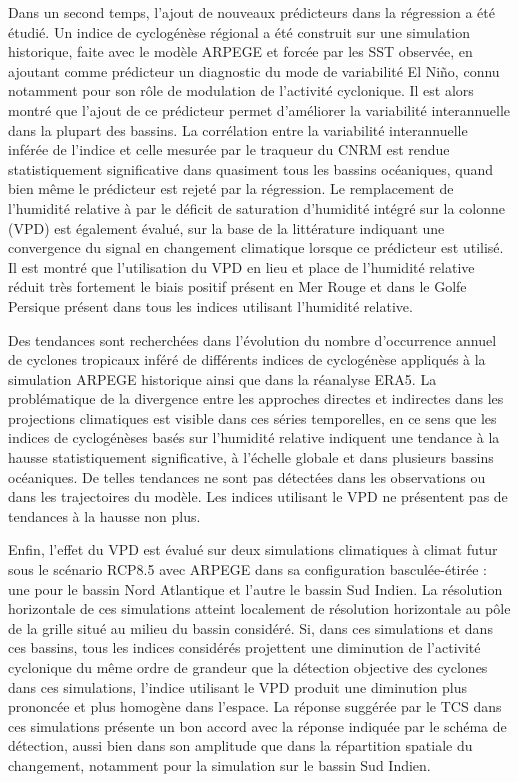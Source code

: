 \documentclass[../main.tex]{subfiles}
\begin{document}
Dans un second temps, l'ajout de nouveaux prédicteurs dans la régression a été étudié. Un indice de cyclogénèse régional a été construit sur une simulation
historique, faite avec le modèle ARPEGE et forcée par les SST observée, en ajoutant comme prédicteur un diagnostic du mode de variabilité El Niño, connu
notamment pour son rôle de modulation de l'activité cyclonique. Il est alors montré que l'ajout de ce prédicteur permet d'améliorer la variabilité interannuelle
dans la plupart des bassins. La corrélation entre la variabilité interannuelle inférée de l'indice et celle mesurée par le traqueur du CNRM est rendue
statistiquement significative dans quasiment tous les bassins océaniques, quand bien même le prédicteur est rejeté par la régression. Le remplacement de
l'humidité relative à  par le déficit de saturation d'humidité intégré sur la colonne (VPD) est également évalué, sur la base de la littérature
indiquant une convergence du signal en changement climatique lorsque ce prédicteur est utilisé. Il est montré que l'utilisation du VPD en lieu et place de
l'humidité relative réduit très fortement le biais positif présent en Mer Rouge et dans le Golfe Persique présent dans tous les indices utilisant l'humidité
relative.

Des tendances sont recherchées dans l'évolution du nombre d'occurrence annuel de cyclones tropicaux inféré de différents indices de cyclogénèse appliqués à la
simulation ARPEGE historique ainsi que dans la réanalyse ERA5. La problématique de la divergence entre les approches directes et indirectes dans les projections
climatiques est visible dans ces séries temporelles, en ce sens que les indices de cyclogénèses basés sur l'humidité relative indiquent une tendance à la hausse
statistiquement significative, à l'échelle globale et dans plusieurs bassins océaniques. De telles tendances ne sont pas détectées dans les observations ou
dans les trajectoires du modèle. Les indices utilisant le VPD ne présentent pas de tendances à la hausse non plus.

Enfin, l'effet du VPD est évalué sur deux simulations climatiques à climat futur sous le scénario RCP8.5 avec ARPEGE dans sa configuration basculée-étirée : une
pour le bassin Nord Atlantique et l'autre le bassin Sud Indien. La résolution horizontale de ces simulations atteint localement  de résolution
horizontale au pôle de la grille situé au milieu du bassin considéré. Si, dans ces simulations et dans ces bassins, tous les indices considérés projettent une
diminution de l'activité cyclonique du même ordre de grandeur que la détection objective des cyclones dans ces simulations, l'indice utilisant le VPD produit
une diminution plus prononcée et plus homogène dans l'espace. La réponse suggérée par le TCS dans ces simulations présente un bon accord avec la réponse
indiquée par le schéma de détection, aussi bien dans son amplitude que dans la répartition spatiale du changement, notamment pour la simulation sur le bassin
Sud Indien.
\end{document}
